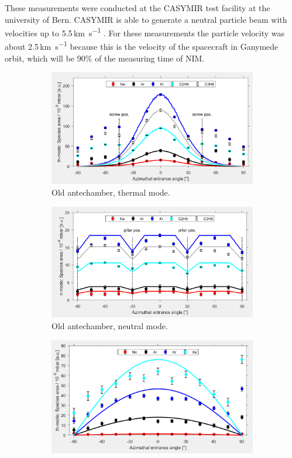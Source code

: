 	These measurements were conducted at the CASYMIR test facility at the university of Bern. CASYMIR is able to generate a neutral particle beam with velocities up to 5.5\,\si{\kilo\meter\per\second} \cite{CASYMIR_Graf2004}. For these measurements the particle velocity was about 2.5\,\si{\kilo\meter\per\second} because this is the velocity of the spacecraft in Ganymede orbit, which will be 90\% of the measuring time of NIM.\\
	\begin{figure}[h!]
		\begin{subfigure}[t]{.5\textwidth}
			\centering
			\includegraphics[width=\textwidth]{Experiments/oldAnte_ThMode.png}
			\caption{Old antechamber, thermal mode.}
		\end{subfigure}
		\begin{subfigure}[t]{.5\textwidth}
			\centering
			\includegraphics[width=\textwidth]{Experiments/oldAnte_NMode.png}
			\caption{Old antechamber, neutral mode.}
		\end{subfigure}
		\begin{subfigure}[b]{.5\textwidth}
			\centering
			\includegraphics[width=\textwidth]{Experiments/newAnte_ThMode.png}

\end{subfigure}
\end{figure}
